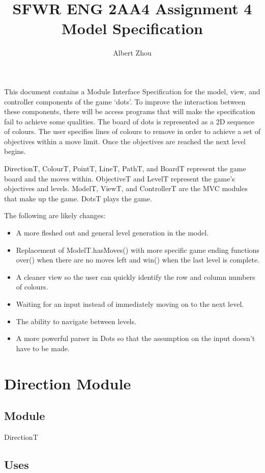 \documentclass[12pt]{article}
\title{SFWR ENG 2AA4 Assignment 4 Model Specification}
\author{Albert Zhou}
\begin{document}
\maketitle

This document contains a Module Interface Specification for the model, view, and controller components of the game `dots'. To improve the interaction between these components, there will be access programs that will make the specification fail to achieve some qualities. The board of dots is represented as a 2D sequence of colours. The user specifies lines of colours to remove in order to achieve a set of objectives within a move limit. Once the objectives are reached the next level begins.

DirectionT, ColourT, PointT, LineT, PathT, and BoardT represent the game board and the moves within. ObjectiveT and LevelT represent the game's objectives and levels. ModelT, ViewT, and ControllerT are the MVC modules that make up the game. DotsT plays the game.

The following are likely changes:
\begin{itemize}
	\item A more fleshed out and general level generation in the model.
	\item Replacement of ModelT.hasMoves() with more specific game ending functions over() when there are no moves left and win() when the last level is complete.
	\item A cleaner view so the user can quickly identify the row and column numbers of colours.
	\item Waiting for an input instead of immediately moving on to the next level.
	\item The ability to navigate between levels.
	\item A more powerful parser in Dots so that the assumption on the input doesn't have to be made.
\end{itemize} 

\newpage

\section* {Direction Module}

\subsection*{Module}

DirectionT

\subsection* {Uses}
\end{document}

